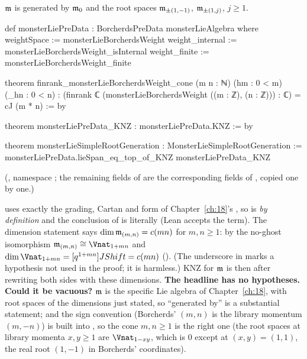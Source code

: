 \begin{theorem}\label{ch20:thm:generation}
$\mathfrak m$ is generated by $\mathfrak m_0$ and the root spaces $\mathfrak m_{\pm(1,-1)}$, $\mathfrak m_{\pm(1,j)}$, $j\ge1$.
\end{theorem}
\begin{leancode}
def monsterLiePreData : BorcherdsPreData monsterLieAlgebra where
  weightSpace := monsterLieBorcherdsWeight
  weight_internal := monsterLieBorcherdsWeight_isInternal
  weight_finite := monsterLieBorcherdsWeight_finite

theorem finrank_monsterLieBorcherdsWeight_cone (m n : ℕ) (hm : 0 < m) (_hn : 0 < n) :
    (finrank ℂ (monsterLieBorcherdsWeight ((m : ℤ), (n : ℤ))) : ℂ) = cJ (m * n) := by

theorem monsterLiePreData_KNZ : monsterLiePreData.KNZ := by

theorem monsterLieSimpleRootGeneration : MonsterLieSimpleRootGeneration :=
  monsterLiePreData.lieSpan_eq_top_of_KNZ monsterLiePreData_KNZ
\end{leancode}
(, namespace ; the remaining
fields of  are the corresponding fields of , copied one by one.)
\begin{dictionary}
 uses exactly the grading, Cartan and form of Chapter~\ref{ch:18}'s , so
 is  \emph{by definition} and the conclusion of
 is literally  (Lean accepts the term).  The dimension
statement says $\dim\mathfrak m_{(m,n)}=c(mn)$ for $m,n\ge1$: by the no-ghost isomorphism
$\chtwentym_{(m,n)}\cong\Vnat_{1+mn}$ and $\dim\Vnat_{1+mn}=[q^{1+mn}]JShift=c(mn)$ ().
(The underscore in  marks a hypothesis not used in the proof; it is harmless.)  KNZ for $\mathfrak m$ is then
 after rewriting both sides with these dimensions.  \textbf{The headline has no hypotheses.}
\textbf{Could it be vacuous?}  $\mathfrak m$ is the specific Lie algebra of Chapter~\ref{ch:18}, with root spaces of the
dimensions just stated, so ``generated by'' is a substantial statement; and the sign convention (Borcherds' $(m,n)$ is the
library momentum $(m,-n)$) is built into , so the cone $m,n\ge1$ is the right one (the root
spaces at library momenta $x,y\ge1$ are $\Vnat_{1-xy}$, which is $0$ except at $(x,y)=(1,1)$, the real root $(1,-1)$ in
Borcherds' coordinates).
\end{dictionary}
